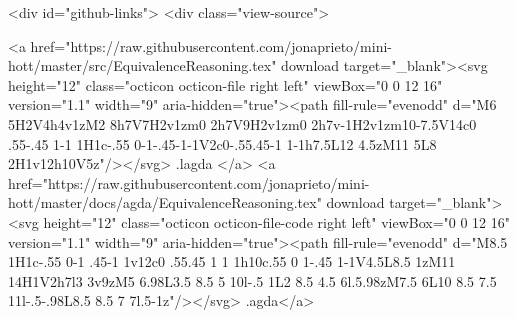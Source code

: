   <div id="github-links">
    <div class="view-source">
      
        <a href="https://raw.githubusercontent.com/jonaprieto/mini-hott/master/src/EquivalenceReasoning.tex" download target="_blank"><svg height="12" class="octicon octicon-file right left" viewBox="0 0 12 16" version="1.1" width="9" aria-hidden="true"><path fill-rule="evenodd" d="M6 5H2V4h4v1zM2 8h7V7H2v1zm0 2h7V9H2v1zm0 2h7v-1H2v1zm10-7.5V14c0 .55-.45 1-1 1H1c-.55 0-1-.45-1-1V2c0-.55.45-1 1-1h7.5L12 4.5zM11 5L8 2H1v12h10V5z"/></svg> .lagda </a>
        <a href="https://raw.githubusercontent.com/jonaprieto/mini-hott/master/docs/agda/EquivalenceReasoning.tex" download target="_blank"><svg height="12" class="octicon octicon-file-code right left" viewBox="0 0 12 16" version="1.1" width="9" aria-hidden="true"><path fill-rule="evenodd" d="M8.5 1H1c-.55 0-1 .45-1 1v12c0 .55.45 1 1 1h10c.55 0 1-.45 1-1V4.5L8.5 1zM11 14H1V2h7l3 3v9zM5 6.98L3.5 8.5 5 10l-.5 1L2 8.5 4.5 6l.5.98zM7.5 6L10 8.5 7.5 11l-.5-.98L8.5 8.5 7 7l.5-1z"/></svg> .agda</a>
      
